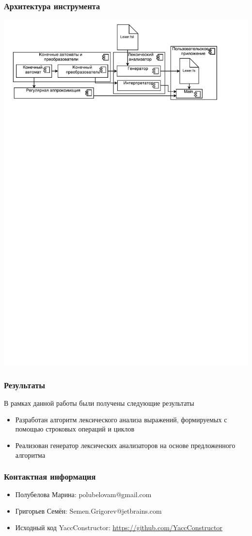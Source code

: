 \documentclass{beamer}
\begin{document}
\begin{frame}
\transwipe[direction=90]
\frametitle{Архитектура инструмента}
\begin{center}
   {\includegraphics[width=1.0\linewidth]{LexerArch}}
\end{center}
\end{frame}


\begin{frame}[fragile]
\transwipe[direction=90]
\frametitle{Результаты}
В рамках данной работы были получены следующие результаты
\begin{itemize}
\item Разработан алгоритм лексического анализа выражений, формируемых с помощью строковых операций и циклов
\item Реализован генератор лексических анализаторов на основе предложенного алгоритма
\end{itemize}
\end{frame}


\begin{frame}
\transwipe[direction=90]
\frametitle{Контактная информация}
\begin{itemize}
\item Полубелова Марина: polubelovam@gmail.com
\item Григорьев Семён: Semen.Grigorev@jetbrains.com
\item Исходный код YaccConstructor:
\url{https://github.com/YaccConstructor}
\end{itemize}
\end{frame}
\end{document}
